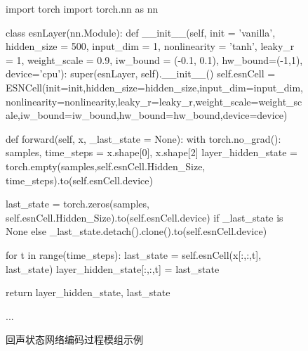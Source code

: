 \begin{figure}
    \begin{python}
    import torch
    import torch.nn as nn
    
    class esnLayer(nn.Module):
        def __init__(self, init = 'vanilla', hidden_size = 500, input_dim = 1, nonlinearity = 'tanh', leaky_r = 1, weight_scale = 0.9, iw_bound = (-0.1, 0.1), hw_bound=(-1,1),  device='cpu'):
            super(esnLayer, self).__init__()
            self.esnCell = ESNCell(init=init,hidden_size=hidden_size,input_dim=input_dim,nonlinearity=nonlinearity,leaky_r=leaky_r,weight_scale=weight_scale,iw_bound=iw_bound,hw_bound=hw_bound,device=device)


        def forward(self, x, _last_state = None):
            with torch.no_grad():
                samples, time_steps = x.shape[0], x.shape[2]
                layer_hidden_state = torch.empty(samples,self.esnCell.Hidden_Size, time_steps).to(self.esnCell.device)
                
                last_state = torch.zeros(samples, self.esnCell.Hidden_Size).to(self.esnCell.device) if _last_state is None else _last_state.detach().clone().to(self.esnCell.device)

                for t in range(time_steps):
                    last_state = self.esnCell(x[:,:,t],  last_state)
                    layer_hidden_state[:,:,t] = last_state                
            
            return layer_hidden_state, last_state

        ...            
    \end{python}
    \caption{回声状态网络编码过程模组示例\label{fig:ch.univ.esnlayer}}
\end{figure}


